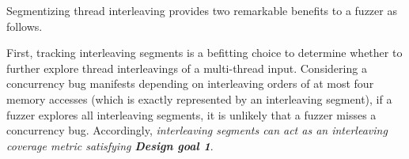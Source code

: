 %
%







%
Segmentizing thread interleaving provides two remarkable benefits to a
fuzzer as follows.




First, tracking interleaving segments is a befitting choice to
determine whether to further explore thread interleavings of a
multi-thread input.
%
%
Considering a concurrency bug manifests depending on interleaving
orders of at most four memory accesses (which is exactly represented
by an interleaving segment), if a fuzzer explores all interleaving
segments, it is unlikely that a fuzzer misses a concurrency bug.
%
Accordingly, \textit{interleaving segments can act as an
  interleaving coverage metric satisfying \textbf{Design goal 1}}.



